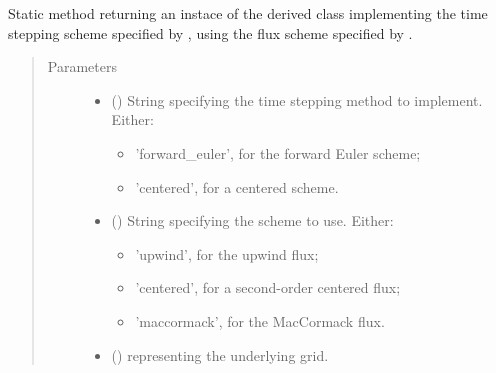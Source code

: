 \documentclass[letterpaper,10pt,english]{sphinxmanual}
\begin{document}
\begin{fulllineitems}
\begin{fulllineitems}
\end{fulllineitems}


\begin{fulllineitems}
\label{\detokenize{api:dycore.prognostic_isentropic.PrognosticIsentropic.factory}}
Static method returning an instace of the derived class implementing the time stepping scheme specified
by , using the flux scheme specified by .
\begin{quote}\begin{description}
\item[{Parameters}] \leavevmode\begin{itemize}
\item {} 
 () \textendash{} 
String specifying the time stepping method to implement. Either:
\begin{itemize}
\item {} 
’forward\_euler’, for the forward Euler scheme;

\item {} 
’centered’, for a centered scheme.

\end{itemize}


\item {} 
 () \textendash{} 
String specifying the scheme to use. Either:
\begin{itemize}
\item {} 
’upwind’, for the upwind flux;

\item {} 
’centered’, for a second-order centered flux;

\item {} 
’maccormack’, for the MacCormack flux.

\end{itemize}


\item {} 
 () \textendash{} {\hyperref[\detokenize{api:grids.grid_xyz.GridXYZ}]{}} representing the underlying grid.


\end{itemize}
\end{description}
\end{quote}
\end{fulllineitems}
\end{fulllineitems}
\end{document}
